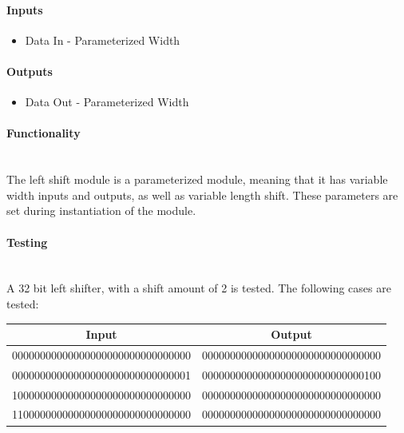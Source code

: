 \documentclass{article}
\begin{document}
    \paragraph{Inputs}
    \begin{itemize}
        \item Data In - Parameterized Width
    \end{itemize}

    \paragraph{Outputs}
    \begin{itemize}
        \item Data Out - Parameterized Width
    \end{itemize}

    \paragraph{Functionality}
    \hfill\\

    The left shift module is a parameterized module, meaning that it has
    variable width inputs and outputs, as well as variable length shift.
    These parameters are set during instantiation of the module.

    \paragraph{Testing}
    \hfill\\

    A 32 bit left shifter, with a shift amount of 2 is tested. The following
    cases are tested:

    \begin{center}
        \begin{tabular}{|c||c|}
            \hline
            Input & Output
            \\\hline\hline
            00000000000000000000000000000000 & 00000000000000000000000000000000
            \\\hline
            00000000000000000000000000000001 & 00000000000000000000000000000100
            \\\hline
            10000000000000000000000000000000 & 00000000000000000000000000000000
            \\\hline
            11000000000000000000000000000000 & 00000000000000000000000000000000
            \\\hline
        \end{tabular}
    \end{center}
\end{document}
